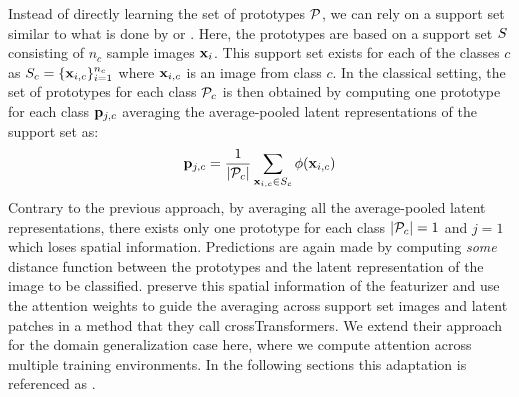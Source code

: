 Instead of directly learning the set of prototypes $\mathcal{P}$, we can rely on a support set similar to what is done by \citet{DoerschGZ20} or \citet{SnellSZ17}. Here, the prototypes are based on a support set $S$ consisting of $n_c$ sample images $\mathbf{x}_i$. This support set exists for each of the classes $c$ as $S_c = \{\mathbf{x}_{i,c}\}_{i=1}^{n_c}$ where $\mathbf{x}_{i,c}$ is an image from class $c$. In the classical setting, the set of prototypes for each class $\mathcal{P}_c$ is then obtained by computing one prototype for each class $\mathbf{p}_{j,c}$ averaging the average-pooled latent representations of the support set as:
\begin{equation}
    \mathbf{p}_{j,c} = \frac{1}{|\mathcal{P}_c|} \sum_{\mathbf{x}_{i,c} \in S_c} \phi(\mathbf{x}_{i,c})
\end{equation}
Contrary to the previous approach, by averaging all the average-pooled latent representations, there exists only one prototype for each class \ie $|\mathcal{P}_c| = 1$ and $j=1$ which loses spatial information. Predictions are again made by computing \emph{some} distance function between the prototypes and the latent representation of the image to be classified. \citet{DoerschGZ20} preserve this spatial information of the featurizer and use the attention weights to guide the averaging across support set images and latent patches in a method that they call crossTransformers. We extend their approach for the domain generalization case here, where we compute attention across multiple training environments. In the following sections this adaptation is referenced as \dtransformers. 

